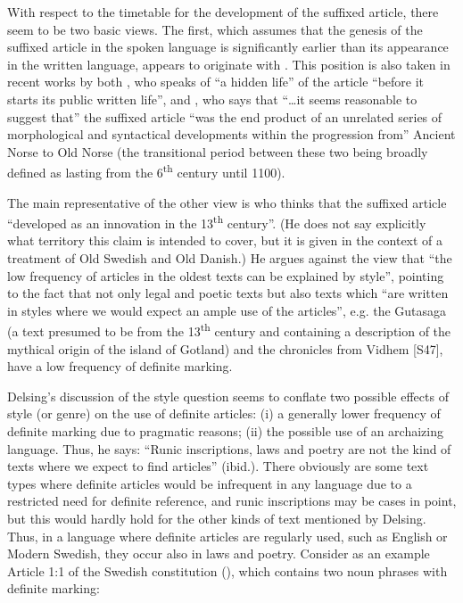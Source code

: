With respect to the timetable for the development of the suffixed article, there seem to be two basic views. The first, which assumes that the genesis of the suffixed article in the spoken language is significantly earlier than its appearance in the written language, appears to originate with \citet{Neckel1924}.  This position is also taken in recent works by both \citet[142]{Perridon1989}, who speaks of “a hidden life” of the article “before it starts its public written life”, and \citet[723]{Syrett2002}, who says that “…it seems reasonable to suggest that” the suffixed article “was the end product of an unrelated series of morphological and syntactical developments within the progression from” Ancient Norse to Old Norse (the transitional period between these two being broadly defined as lasting from the 6\textsuperscript{th} century until 1100). 

The main representative of the other view is \citet[938-939]{Delsing2002} who thinks that the suffixed article “developed as an innovation in the 13\textsuperscript{th} century”. (He does not say explicitly what territory this claim is intended to cover, but it is given in the context of a treatment of Old Swedish and Old Danish.) He argues against the view that “the low frequency of articles in the oldest texts can be explained by style”, pointing to the fact that not only legal and poetic texts but also texts which “are written in styles where we would expect an ample use of the articles”,  e.g. the Gutasaga (a text presumed to be from the 13\textsuperscript{th} century and containing a description of the mythical origin of the island of Gotland) and the chronicles from Vidhem [S47], have a low frequency of definite marking. 

Delsing’s discussion of the style question seems to conflate two possible effects of style (or genre) on the use of definite articles: (i) a generally lower frequency of definite marking due to pragmatic reasons; (ii) the possible use of an archaizing language. Thus, he says: “Runic inscriptions, laws and poetry are not the kind of texts where we expect to find articles” (ibid.). There obviously are some text types where definite articles would be infrequent in any language due to a restricted need for definite reference, and runic inscriptions may be cases in point, but this would hardly hold for the other kinds of text mentioned by Delsing. Thus, in a language where definite articles are regularly used, such as English or Modern Swedish, they occur also in laws and poetry. Consider as an example Article 1:1 of the Swedish constitution (), which contains two noun phrases with definite marking:

